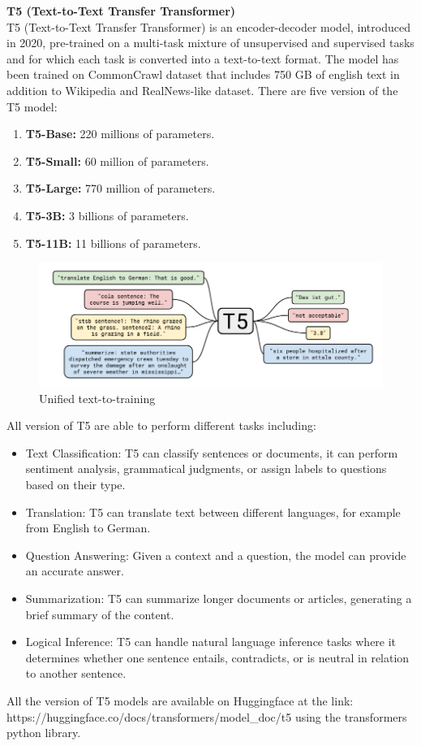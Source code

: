 \textbf{T5 (Text-to-Text Transfer Transformer)}\\
T5 (Text-to-Text Transfer Transformer) is an encoder-decoder model, introduced in 2020, pre-trained on a multi-task mixture of unsupervised and supervised tasks\cite{raffel2020exploring} and for which each task is converted into a text-to-text format. The model has been trained on CommonCrawl dataset that includes 750 GB of english text in addition to Wikipedia and RealNews-like dataset.
There are five version of the T5 model:
\begin{enumerate}
    \item \textbf{T5-Base:} 220 millions of parameters.
    \item \textbf{T5-Small:} 60 million of parameters.
    \item \textbf{T5-Large:} 770 million of parameters.
    \item \textbf{T5-3B:} 3 billions of parameters.
    \item \textbf{T5-11B:} 11 billions of parameters.
\end{enumerate}
\begin{figure}[H]
    \centering
    \includegraphics[width=0.8\linewidth]{Figures/fig_19.png}
    \caption{Unified text-to-training}
    \label{fig:enter-label}
\end{figure}
All version of T5 are able to perform different tasks including:\cite{t5_docs}
\begin{itemize}
    \item Text Classification: T5 can classify sentences or documents, it can perform sentiment analysis, grammatical judgments, or assign labels to questions based on their type.

    \item Translation: T5 can translate text between different languages, for example from English to German.

    \item Question Answering: Given a context and a question, the model can provide an accurate answer.

    \item Summarization: T5 can summarize longer documents or articles, generating a brief summary of the content.

    \item Logical Inference: T5 can handle natural language inference tasks where it determines whether one sentence entails, contradicts, or is neutral in relation to another sentence.
\end{itemize}
All the version of T5 models are available on Huggingface at the link:\\
https://huggingface.co/docs/transformers/model\_doc/t5 
using the transformers python library.\\

